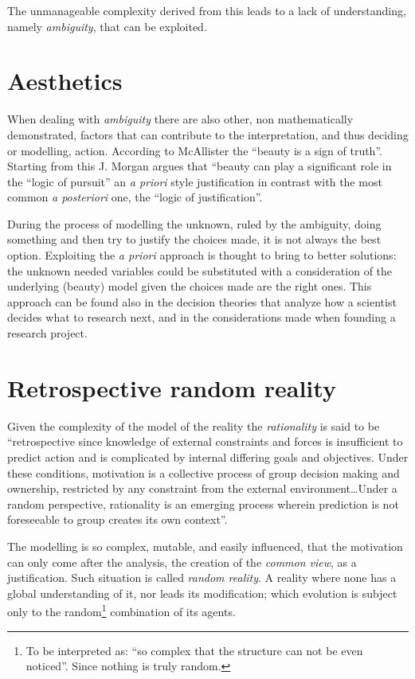 The unmanageable complexity derived from this leads to a lack of understanding, namely
\textit{ambiguity}, that can be exploited.


\section{Aesthetics}
When dealing with \textit{ambiguity} there are also other, non mathematically demonstrated, factors that can contribute to the interpretation, and thus deciding or modelling, action.
According to McAllister the ``beauty is a sign of truth''\cite{McAllister96,McAllister98}.
Starting from this J. Morgan argues that ``beauty can play a significant role in the
``logic of pursuit''\cite{JMorgan} an \textit{a priori} style justification in contrast
with the most common \textit{a posteriori} one, the ``logic of justification''.

During the process of modelling  the unknown, ruled by the ambiguity, doing something and then
try to justify the choices made, it is not always the best option.
Exploiting the \textit{a priori} approach is thought to bring to better solutions:
the unknown needed variables could be substituted with a consideration of the
underlying (beauty) model given the choices made are
the right ones.
This approach can be found also in the decision theories that analyze
how a scientist decides what to research next, and in the considerations made
when founding a research project\cite{JMorgan}.


\section{Retrospective random reality}
Given the complexity of the model of the reality the \textit{rationality}
is said to be ``retrospective since knowledge of external constraints and forces
is insufficient to predict action and is complicated by internal differing goals
and objectives. Under these conditions, motivation is a collective process of
group decision making and ownership, restricted by any constraint from the
external environment\dots{}Under a random perspective, rationality is an emerging process wherein prediction is not foreseeable to group creates its own context''\cite{Personell}.

The modelling is so complex, mutable, and easily influenced, that the motivation can only come after the analysis, the creation of the \textit{common view}, as a justification.
Such situation is called \textit{random reality}. A reality where none has a
global understanding of it, nor leads its modification; which evolution is
subject only to the random\footnote{To be interpreted as: ``so complex that
the structure can not be even noticed''. Since nothing is truly random.}
combination of its agents.


